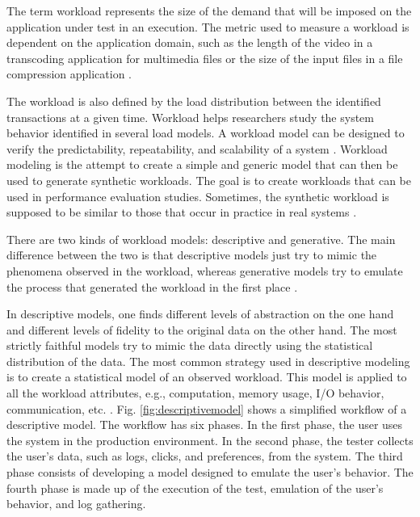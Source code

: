 \documentclass[espaco=umemeio,chapter=TITLE,twoside,openright]{abnt}
\begin{document}
The term workload represents the size of the demand that will be imposed on the application under test in an execution. The metric used to measure a workload is dependent on the application domain, such as the length of the video in a transcoding application for multimedia files or the size of the input files in a file compression application \cite{Feitelson2013} \cite{Molyneaux2009} \cite{Goncalves2014}.

The workload is also defined by the load distribution between the identified transactions at a given time. Workload helps researchers study the system behavior identified in several load models. A workload model can be designed to verify the predictability, repeatability, and scalability of a system \cite{Feitelson2013} \cite{Molyneaux2009}. Workload modeling is the attempt to create a simple and generic model that can then be used to generate synthetic workloads. The goal is to create workloads that can be used in performance evaluation studies. Sometimes, the synthetic workload is supposed to be similar to those that occur in practice in real systems \cite{Feitelson2013} \cite{Molyneaux2009}.

There are two kinds of workload models: descriptive and generative. The main difference between the two is that descriptive models just try to mimic the phenomena observed in the workload, whereas generative models try to emulate the process that generated the workload in the first place \cite{Feitelson2013}.

In descriptive models, one finds different levels of abstraction on the one hand and different levels of fidelity to the original data on the other hand. The most strictly faithful models try to mimic the data directly using the statistical distribution of the data. The most common strategy used in descriptive modeling is to create a statistical model of an observed workload. This model is applied to all the workload attributes, e.g., computation, memory usage, I/O behavior, communication, etc. \cite{Feitelson2013}. Fig. \ref{fig:descriptivemodel} shows a simplified workflow of a descriptive model. The workflow has six phases. In the first phase, the user uses the system in the production environment. In the second phase, the tester collects the user's data, such as logs, clicks, and preferences, from the system. The third phase consists of developing a model designed to emulate the user's behavior. The fourth phase is made up of the execution of the test, emulation of the user's behavior, and log gathering.
\end{document}
